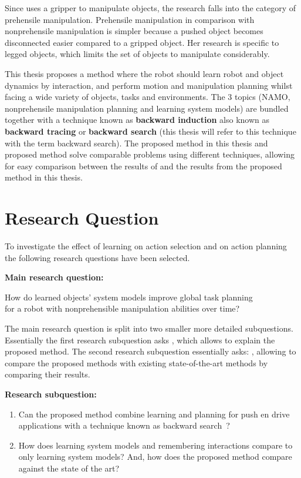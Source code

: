 Since \citeauthor{sabbaghnovin_model_2021} uses a gripper to manipulate objects, the research falls into the category of prehensile manipulation. Prehensile manipulation in comparison with nonprehensile manipulation is simpler because a pushed object becomes disconnected easier compared to a gripped object. Her research is specific to legged objects, which limits the set of objects to manipulate considerably.\bs

This thesis proposes a method where the robot should learn robot and object dynamics by interaction, and perform motion and manipulation planning whilst facing a wide variety of objects, tasks and environments. The 3 topics (\ac{NAMO}, nonprehensile manipulation planning and learning system models) are bundled together with a technique known as \textbf{backward induction} also known as \textbf{backward tracing} or \textbf{backward search} (this thesis will refer to this technique with the term backward search). The proposed method in this thesis and \citeauthor{sabbaghnovin_model_2021} proposed method solve comparable problems using different techniques, allowing for easy comparison between the results of \citeauthor{sabbaghnovin_model_2021} and the results from the proposed method in this thesis.\bs

\section{Research Question}%
\label{sec:research_question}
To investigate the effect of learning on action selection and on action planning the following research questions have been selected.\bs

\textbf{Main research question:}
\begin{center}%
\label{researchquestion:main}
\large
How do learned objects' system models improve global task planning\\for a robot with nonprehensible manipulation abilities over time?
\end{center} 

The main research question is split into two smaller more detailed subquestions. Essentially the first research subquestion asks , which allows to explain the proposed method. The second research subquestion essentially asks: , allowing to compare the proposed methods with existing state-of-the-art methods by comparing their results.\bs

\textbf{Research subquestion:}
\begin{enumerate}
    \item\label{researchsubquestion:does_it_work} Can the proposed method combine learning and planning for push en drive applications with a technique known as backward search~\cite{krontiris_dealing_2015}?
    \item\label{researchsubquestion:does_it_compare} How does learning system models and remembering interactions compare to only learning system models? And, how does the proposed method compare against the state of the art? 
\end{enumerate}

